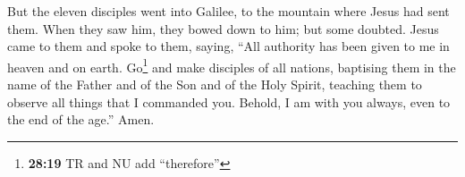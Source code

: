  But the eleven disciples went into Galilee, to the
mountain where Jesus had sent them.  When they saw him,
they bowed down to him; but some doubted.  Jesus came to
them and spoke to them, saying, ``All authority has been given to me in
heaven and on earth.  Go\footnote{\textbf{28:19} TR and
  NU add ``therefore''} and make disciples of all nations, baptising
them in the name of the Father and of the Son and of the Holy Spirit,
 teaching them to observe all things that I commanded
you. Behold, I am with you always, even to the end of the age.'' Amen.
